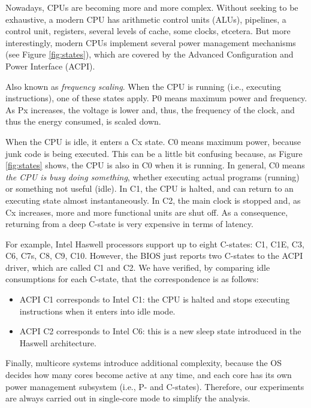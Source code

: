 \documentclass[twoside,nohyper]{tufte-book}
\providecommand{\tightlist}{%
  \setlength{\itemsep}{0pt}\setlength{\parskip}{0pt}}
\begin{document}
Nowadays, CPUs are becoming more and more complex. Without seeking to be exhaustive, a modern CPU has arithmetic control units (ALUs), pipelines, a control unit, registers, several levels of cache, some clocks, etcetera. But more interestingly, modern CPUs implement several power management mechanisms (see Figure \ref{fig:states}), which are covered by the Advanced Configuration and Power Interface (ACPI).

\begin{description}
\tightlist
\item[P-states]
Also known as \emph{frequency scaling}. When the CPU is running (i.e., executing instructions), one of these states apply. P0 means maximum power and frequency. As Px increases, the voltage is lower and, thus, the frequency of the clock, and thus the energy consumed, is scaled down.
\item[C-states]
When the CPU is idle, it enters a Cx state. C0 means maximum power, because junk code is being executed. This can be a little bit confusing because, as Figure \ref{fig:states} shows, the CPU is also in C0 when it is running. In general, C0 means \emph{the CPU is busy doing something}, whether executing actual programs (running) or something not useful (idle). In C1, the CPU is halted, and can return to an executing state almost instantaneously. In C2, the main clock is stopped and, as Cx increases, more and more functional units are shut off. As a consequence, returning from a deep C-state is very expensive in terms of latency.
\end{description}

For example, Intel Haswell processors support up to eight C-states: C1, C1E, C3, C6, C7s, C8, C9, C10. However, the BIOS just reports two C-states to the ACPI driver, which are called C1 and C2. We have verified, by comparing idle consumptions for each C-state, that the correspondence is as follows:

\begin{itemize}
\tightlist
\item
  ACPI C1 corresponds to Intel C1: the CPU is halted and stops executing instructions when it enters into idle mode.
\item
  ACPI C2 corresponds to Intel C6: this is a new sleep state introduced in the Haswell architecture.
\end{itemize}

Finally, multicore systems introduce additional complexity, because the OS decides how many cores become active at any time, and each core has its own power management subsystem (i.e., P- and C-states). Therefore, our experiments are always carried out in single-core mode to simplify the analysis.
\end{document}
